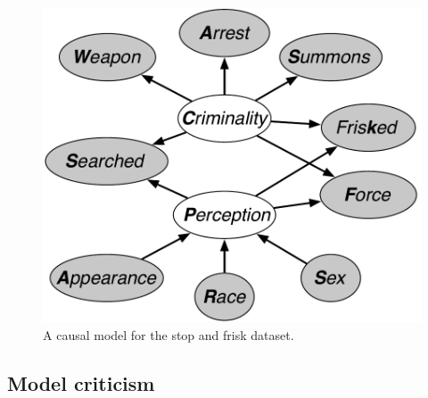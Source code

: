 \begin{figure}[th]
\begin{center}
\vspace{-1ex}
\centerline{\includegraphics[width=\columnwidth]{stop_and_frisk_model2.pdf}}
\vspace{-2ex}
\caption{A causal model for the stop and frisk dataset.\label{figure.stop_and_frisk}}
\vspace{-2ex}
\end{center}
\end{figure}



\subsection{Model criticism}